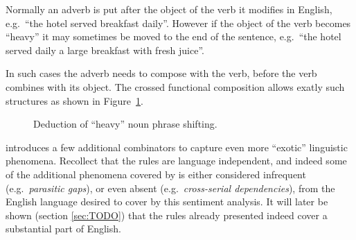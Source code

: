 \begin{example}
Normally an adverb is put after the object of the verb it modifies in English, e.g.\ ``the hotel served breakfast daily''. However if the object of the verb becomes ``heavy'' it may sometimes be moved to the end of the sentence, e.g.\ ``the hotel served daily a large breakfast with fresh juice''.

In such cases the adverb needs to compose with the verb, before the verb combines with its object. The crossed functional composition allows exatly such structures as shown in Figure~\ref{fig:heavyNP}.

\begin{figure}[ht]
\center
{}
\caption{Deduction of ``heavy'' noun phrase shifting.}
\label{fig:heavyNP}
\end{figure}
\label{ex:heavyNP}
\end{example}
\done

\citeauthor{ts}  introduces a few additional combinators to capture even more ``exotic'' linguistic phenomena. Recollect that the rules are language independent, and indeed some of the additional phenomena covered by \citeauthor{sp} is either considered infrequent (e.g.\ \emph{parasitic gaps}), or even absent (e.g.\ \emph{cross-serial dependencies}), from the English language desired to cover by this sentiment analysis. It will later be shown (section \ref{sec:TODO}) that the rules already presented indeed cover a substantial part of English.

